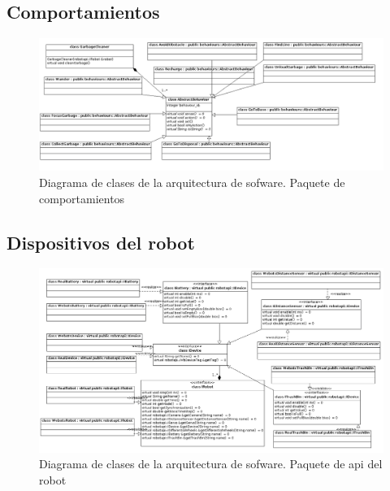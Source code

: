 \subsection{Comportamientos}
\begin{landscape}
\begin{figure}[h]
	\centering
	\includegraphics[scale=0.52]{comportamientos/figures/api1.png}
	\caption[Arquitectura de software: comportamientos]{Diagrama de clases de la arquitectura
			de sofware. Paquete de comportamientos}
	\label{fig:soft_arq_behaviours}
\end{figure}
\end{landscape}

\subsection{Dispositivos del robot}
\begin{landscape}
\begin{figure}[h]
	\centering
	\includegraphics[scale=0.5]{comportamientos/figures/api2.png}
	\caption[Arquitectura de software: api de robot]{Diagrama de clases de la arquitectura
			de sofware. Paquete de api del robot}
	\label{fig:soft_arq_devices}
\end{figure}
\end{landscape}

